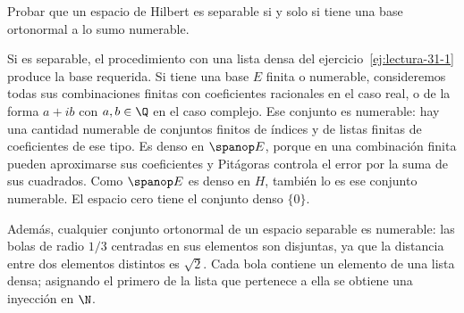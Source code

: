 \begin{ejercicio}\label{ej:lectura-31-5}
Probar que un espacio de Hilbert es separable si y solo si tiene una base ortonormal a lo sumo numerable.
\end{ejercicio}
\begin{solucion}
Si es separable, el procedimiento con una lista densa del ejercicio~\ref{ej:lectura-31-1} produce la base requerida. Si tiene una base $E$ finita o numerable, consideremos todas sus combinaciones finitas con coeficientes racionales en el caso real, o de la forma $a+ib$ con $a,b\in\Q$ en el caso complejo. Ese conjunto es numerable: hay una cantidad numerable de conjuntos finitos de índices y de listas finitas de coeficientes de ese tipo. Es denso en $\spanop E$, porque en una combinación finita pueden aproximarse sus coeficientes y Pitágoras controla el error por la suma de sus cuadrados. Como $\spanop E$ es denso en $H$, también lo es ese conjunto numerable. El espacio cero tiene el conjunto denso $\{0\}$.

Además, cualquier conjunto ortonormal de un espacio separable es numerable: las bolas de radio $1/3$ centradas en sus elementos son disjuntas, ya que la distancia entre dos elementos distintos es $\sqrt2$. Cada bola contiene un elemento de una lista densa; asignando el primero de la lista que pertenece a ella se obtiene una inyección en $\N$.
\end{solucion}

